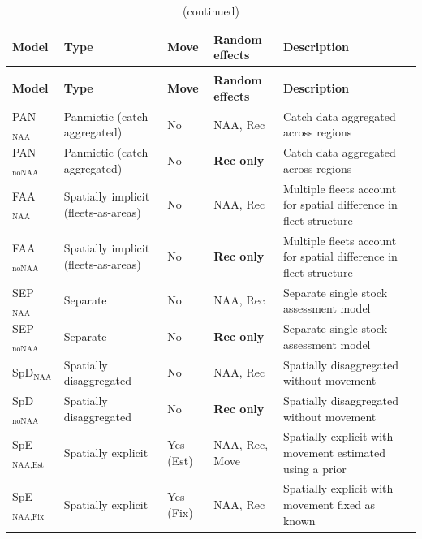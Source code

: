 \begin{landscape}
\begin{longtable}{p{3cm} p{6cm} p{2cm} p{3.5cm} p{5.5cm}}  
  \caption{Descriptions of 10 estimation models} \label{EM_tabel} \\
  \toprule
  \textbf{Model} & \textbf{Type} & \textbf{Move} & \textbf{Random effects} & \textbf{Description} \\
  \midrule
  \endfirsthead
  \caption[]{(continued)} \\
  \toprule
  \textbf{Model} & \textbf{Type} & \textbf{Move} & \textbf{Random effects} & \textbf{Description} \\
  \midrule
  \endhead
  \bottomrule
  \endfoot

  PAN$_{\text{NAA}}$ & Panmictic (catch aggregated) & No & NAA, Rec & Catch data aggregated across regions \\
  PAN$_{\text{noNAA}}$ & Panmictic (catch aggregated) & No & \textbf{Rec only} & Catch data aggregated across regions \\
  FAA$_{\text{NAA}}$ & Spatially implicit (fleets-as-areas) & No & NAA, Rec & Multiple fleets account for spatial difference in fleet structure \\
  FAA$_{\text{noNAA}}$ & Spatially implicit (fleets-as-areas) & No & \textbf{Rec only} & Multiple fleets account for spatial difference in fleet structure \\
  SEP$_{\text{NAA}}$ & Separate & No & NAA, Rec & Separate single stock assessment model \\
  SEP$_{\text{noNAA}}$ & Separate & No & \textbf{Rec only} & Separate single stock assessment model \\
  SpD$_{\text{NAA}}$ & Spatially disaggregated & No & NAA, Rec & Spatially disaggregated without movement \\
  SpD$_{\text{noNAA}}$ & Spatially disaggregated & No & \textbf{Rec only} & Spatially disaggregated without movement \\
  SpE$_{\text{NAA,Est}}$ & Spatially explicit & Yes (Est) & NAA, Rec, Move & Spatially explicit with movement estimated using a prior \\
  SpE$_{\text{NAA,Fix}}$ & Spatially explicit & Yes (Fix) & NAA, Rec & Spatially explicit with movement fixed as known \\
  
\end{longtable}
\end{landscape}
